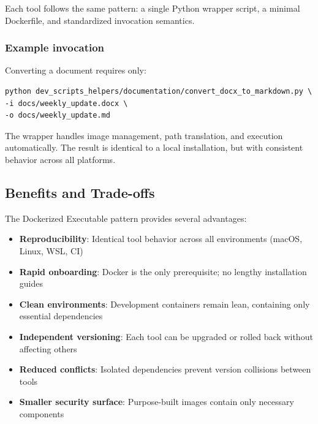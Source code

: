 Each tool follows the same pattern: a single Python wrapper script, a minimal
Dockerfile, and standardized invocation semantics.

\subsubsection{Example invocation}

Converting a document requires only:

\begin{verbatim}
python dev_scripts_helpers/documentation/convert_docx_to_markdown.py \
-i docs/weekly_update.docx \
-o docs/weekly_update.md
\end{verbatim}

The wrapper handles image management, path translation, and execution
automatically. The result is identical to a local installation, but
with consistent behavior across all platforms.

\subsection{Benefits and Trade-offs}

The Dockerized Executable pattern provides several advantages:

\begin{itemize}
  \item \textbf{Reproducibility}: Identical tool behavior across all environments
    (macOS, Linux, WSL, CI)

  \item \textbf{Rapid onboarding}: Docker is the only prerequisite; no
    lengthy installation guides

  \item \textbf{Clean environments}: Development containers remain lean,
    containing only essential dependencies

  \item \textbf{Independent versioning}: Each tool can be upgraded or rolled
    back without affecting others

  \item \textbf{Reduced conflicts}: Isolated dependencies prevent version
    collisions between tools

  \item \textbf{Smaller security surface}: Purpose-built images contain
    only necessary components
\end{itemize}

